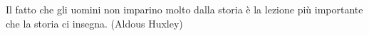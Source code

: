 \pagebreak~

\thispagestyle{empty}

\pagebreak~

\setcounter{page}{1}

\begin{changemargin}{0.3cm}{0.3cm}\begin{tcolorbox}[enhanced,arc=5pt,boxrule=0.3pt]{
Il fatto che gli uomini non imparino molto dalla storia è la lezione più importante che la storia ci insegna. (Aldous Huxley)
}\end{tcolorbox}\end{changemargin}

